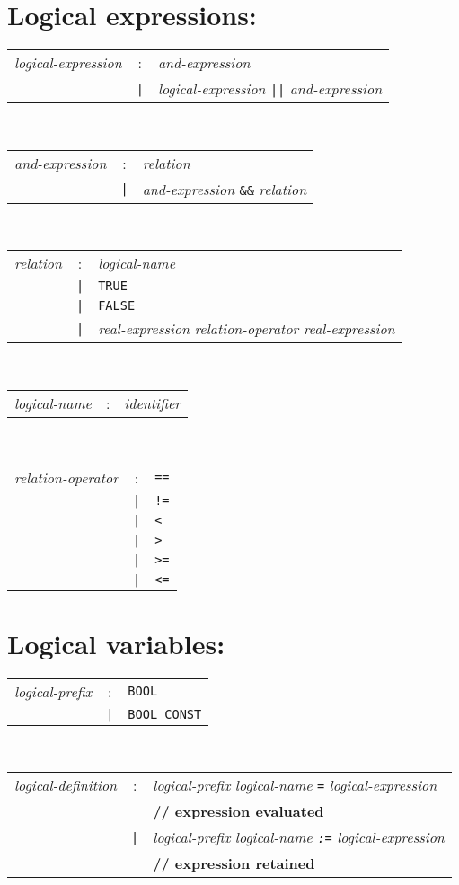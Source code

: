 \section*{Logical expressions:}
\begin{tabular}{p{4cm}cl}
\textit{logical-expression}
  &:& \textit{and-expression} \\
  &\texttt{|}& \textit{logical-expression} \texttt{||} \textit{and-expression}
\end{tabular}
\\
\begin{tabular}{p{4cm}cl}
\textit{and-expression}
  &:& \textit{relation} \\
  &\texttt{|}& \textit{and-expression} \texttt{\&\&} \textit{relation}
\end{tabular}
\\
\begin{tabular}{p{4cm}cl}
\textit{relation}
  &:& \textit{logical-name} \\
  &\texttt{|}& \texttt{TRUE} \\
  &\texttt{|}& \texttt{FALSE} \\
  &\texttt{|}& \textit{real-expression} \textit{relation-operator}
    \textit{real-expression}
\end{tabular}
\\
\begin{tabular}{p{4cm}cl}
\textit{logical-name}
  &:& \textit{identifier}
\end{tabular}
\\
\begin{tabular}{p{4cm}cl}
\textit{relation-operator}
  &:& \texttt{==} \\
  &\texttt{|}& \texttt{!=} \\
  &\texttt{|}& \texttt{<} \\
  &\texttt{|}& \texttt{>} \\
  &\texttt{|}& \texttt{>=} \\
  &\texttt{|}& \texttt{<=}
\end{tabular}

\section*{Logical variables:}
\begin{tabular}{p{4cm}cl}
\textit{logical-prefix}
  &:& \texttt{BOOL} \\
  &\texttt{|}& \texttt{BOOL CONST}
\end{tabular}
\\
\begin{tabular}{p{4cm}cl}
\textit{logical-definition}
  &:& \textit{logical-prefix} \textit{logical-name} \texttt{=}
    \textit{logical-expression} \\
 & &\textbf{// expression evaluated} \\
  &\texttt{|}& \textit{logical-prefix} \textit{logical-name \texttt{:=}}
    \textit{logical-expression} \\
 & &\textbf{// expression retained}
\end{tabular}
\\
\begin{tabular}{p{4cm}cl}
\end{tabular}

